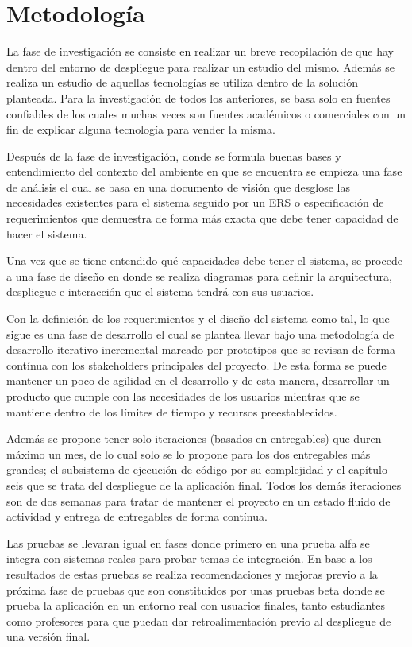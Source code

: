 \section{Metodología}
La fase de investigación se consiste en realizar un breve recopilación de que hay dentro del entorno de despliegue para realizar un estudio del mismo. Además se realiza un estudio de aquellas tecnologías se utiliza dentro de la solución planteada. Para la investigación de todos los anteriores, se basa solo en fuentes confiables de los cuales muchas veces son fuentes académicos o comerciales con un fin de explicar alguna tecnología para vender la misma.
 
Después de la fase de investigación, donde se formula buenas bases y entendimiento del contexto del ambiente en que se encuentra se empieza una fase de análisis el cual se basa en una documento de visión que desglose las necesidades existentes para el sistema seguido por un ERS o especificación de requerimientos que demuestra de forma más exacta que debe tener capacidad de hacer el sistema.
 
Una vez que se tiene entendido qué capacidades debe tener el sistema, se procede a una fase de diseño en donde se realiza diagramas para definir la arquitectura, despliegue e interacción que el sistema tendrá con sus usuarios.
 
Con la definición de los requerimientos y el diseño del sistema como tal, lo que sigue es una fase de desarrollo el cual se plantea llevar bajo una metodología de desarrollo iterativo incremental marcado por prototipos que se revisan de forma contínua con los stakeholders principales del proyecto. De esta forma se puede mantener un poco de agilidad en el desarrollo y de esta manera, desarrollar un producto que cumple con las necesidades de los usuarios mientras que se mantiene dentro de los límites de tiempo y recursos preestablecidos.
 
Además se propone tener solo iteraciones (basados en entregables) que duren máximo un mes, de lo cual solo se lo propone para los dos entregables más grandes; el subsistema de ejecución de código por su complejidad y el capítulo seis que se trata del despliegue de la aplicación final. Todos los demás iteraciones son de dos semanas para tratar de mantener el proyecto en un estado fluido de actividad y entrega de entregables de forma contínua.
 
Las pruebas se llevaran igual en fases donde primero en una prueba alfa se integra con sistemas reales para probar temas de integración. En base a los resultados de estas pruebas se realiza recomendaciones y mejoras previo a la próxima fase de pruebas que son constituidos por unas pruebas beta donde se prueba la aplicación en un entorno real con usuarios finales, tanto estudiantes como profesores para que puedan dar retroalimentación previo al despliegue de una versión final.
 
